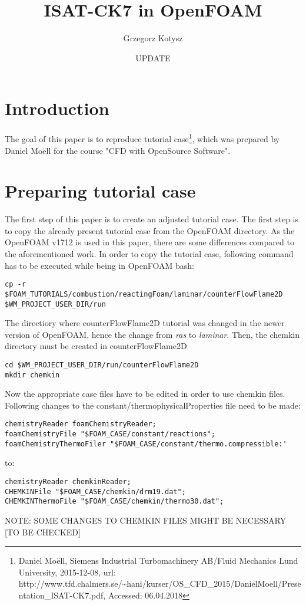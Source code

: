\documentclass[12pt,english]{article}
\begin{document}
\title{ISAT-CK7 in OpenFOAM}


\author{Grzegorz Kotysz}


\date{UPDATE}

\maketitle
\newpage{}

\tableofcontents{}

\newpage{}

\section{Introduction}

The goal of this paper is to reproduce tutorial case\footnote{Daniel Moëll, Siemens Industrial Turbomachinery AB/Fluid Mechanics Lund University, 2015-12-08, url: http://www.tfd.chalmers.se/\~{}hani/kurser/OS\_CFD\_2015/DanielMoell/Presentation\_ISAT-CK7.pdf, Accessed: 06.04.2018}, which was prepared by Daniel Moëll for the course "CFD with OpenSource Software". 

\section{Preparing tutorial case}

The first step of this paper is to create an adjusted tutorial case. The first step is to copy the already present tutorial case from the OpenFOAM directory. As the OpenFOAM v1712 is used in this paper, there are some differences compared to the aforementioned work. In order to copy the tutorial case, following command has to be executed while being in OpenFOAM bash:
\begin{lstlisting}
cp -r 
$FOAM_TUTORIALS/combustion/reactingFoam/laminar/counterFlowFlame2D
$WM_PROJECT_USER_DIR/run
\end{lstlisting}

The directiory where counterFlowFlame2D tutorial was changed in the newer version of OpenFOAM, hence the change from \textit{ras} to \textit{laminar}. Then, the chemkin directory must be created in counterFlowFlame2D
\begin{lstlisting}
cd $WM_PROJECT_USER_DIR/run/counterFlowFlame2D
mkdir chemkin
\end{lstlisting}

Now the appropriate case files have to be edited in order to use chemkin files. Following changes to the constant/thermophysicalProperties file need to be made:
\begin{lstlisting}
chemistryReader foamChemistryReader;
foamChemistryFile "$FOAM_CASE/constant/reactions";
foamChemistryThermoFiler "$FOAM_CASE/constant/thermo.compressible:'
\end{lstlisting}
to:
\begin{lstlisting}
chemistryReader chemkinReader;
CHEMKINFile "$FOAM_CASE/chemkin/drm19.dat";
CHEMKINThermoFile "$FOAM_CASE/chemkin/thermo30.dat";
\end{lstlisting}
NOTE: SOME CHANGES TO CHEMKIN FILES MIGHT BE NECESSARY [TO BE CHECKED]
\end{document}
